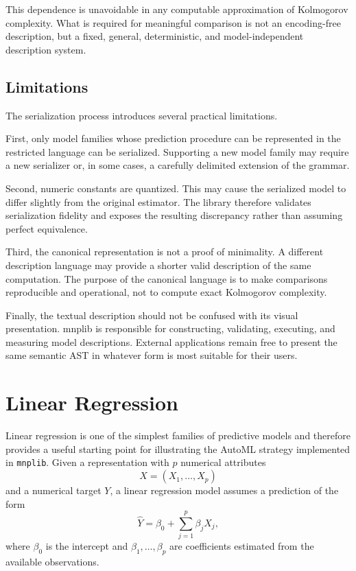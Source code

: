 This dependence is unavoidable in any computable approximation of
Kolmogorov complexity. What is required for meaningful comparison is not an
encoding-free description, but a fixed, general, deterministic, and
model-independent description system.

\subsection{Limitations}

The serialization process introduces several practical limitations.

First, only model families whose prediction procedure can be represented in the
restricted language can be serialized. Supporting a new model family may
require a new serializer or, in some cases, a carefully delimited extension of
the grammar.

Second, numeric constants are quantized. This may cause the serialized model to
differ slightly from the original estimator. The library therefore validates
serialization fidelity and exposes the resulting discrepancy rather than
assuming perfect equivalence.

Third, the canonical representation is not a proof of minimality. A different
description language may provide a shorter valid description of the same
computation. The purpose of the canonical language is to make comparisons
reproducible and operational, not to compute exact Kolmogorov complexity.

Finally, the textual description should not be confused with its visual
presentation. mnplib is responsible for constructing, validating, executing,
and measuring model descriptions. External applications remain free to present
the same semantic AST in whatever form is most suitable for their users.

%
%

\section{Linear Regression}
\label{subsec:automl_linear_regression}

Linear regression is one of the simplest families of predictive models and therefore provides a useful starting point for illustrating the AutoML strategy implemented in \texttt{mnplib}. Given a representation with \(p\) numerical attributes
\[
X=(X_1,\ldots,X_p)
\]
and a numerical target \(Y\), a linear regression model assumes a prediction of the form
\[
\widehat{Y} = \beta_0 + \sum_{j=1}^{p}\beta_j X_j,
\]
where \(\beta_0\) is the intercept and \(\beta_1,\ldots,\beta_p\) are coefficients estimated from the available
observations.

